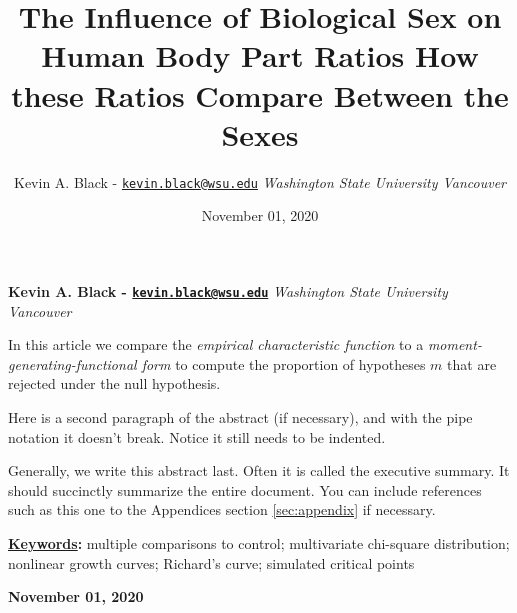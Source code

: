 \documentclass[]{article}
\title{\textbf{\textcolor{WSU.crimson}{The Influence of Biological Sex on Human Body Part Ratios}} \newline \textbf{\textcolor{WSU.gray}{How these Ratios Compare Between the Sexes}}  }
\author{\Large Kevin A. Black -
\href{mailto:kevin.black@wsu.edu}{\nolinkurl{kevin.black@wsu.edu}}\vspace{0.05in} \newline\normalsize\emph{Washington State University Vancouver}  }
\date{November 01, 2020}
\newcommand*{\authorfont}{\fontfamily{phv}\selectfont}
\renewenvironment{abstract}
 {{%
    \setlength{\leftmargin}{0mm}
    \setlength{\rightmargin}{\leftmargin}%
  }%
  \relax}
 {\endlist}
\begin{document}
	
%

{%
\setlength{\parindent}{0pt}
\thispagestyle{plain}
{\fontsize{18}{20}\selectfont\raggedright 
\maketitle  %

}

{
   \vskip 13.5pt\relax \normalsize\fontsize{11}{12} 
   
\textbf{\authorfont Kevin A. Black -
\href{mailto:kevin.black@wsu.edu}{\nolinkurl{kevin.black@wsu.edu}}} \hskip 15pt \emph{\small Washington State University Vancouver}   

}

}








\begin{abstract}

    \hbox{\vrule height .2pt width 39.14pc}

    \vskip 8.5pt %

\noindent In this article we compare the \emph{empirical characteristic function}
\citep{Tukey:1977, Becker:1988} to a
\emph{moment-generating-functional form} to compute the proportion of
hypotheses \(m\) that are rejected under the null hypothesis.
\vspace{0.25in}

\noindent Here is a second paragraph of the abstract (if necessary), and
with the pipe notation it doesn't break. Notice it still needs to be
indented. \vspace{0.25in}

\noindent Generally, we write this abstract last. Often it is called the
executive summary. It should succinctly summarize the entire document.
You can include references such as this one to the Appendices section
\ref{sec:appendix} if necessary.


\vskip 8.5pt \noindent \textbf{\underline{Keywords}:} multiple comparisons to control; multivariate chi-square distribution;
nonlinear growth curves; Richard's curve; simulated critical points \par

    




    
    \hbox{\vrule height .2pt width 39.14pc}
    \vskip 5pt 
    \hfill \textbf{\textcolor{WSU.gray}{ November 01, 2020 } }
    \vskip 5pt 
    
\end{abstract}
\end{document}
